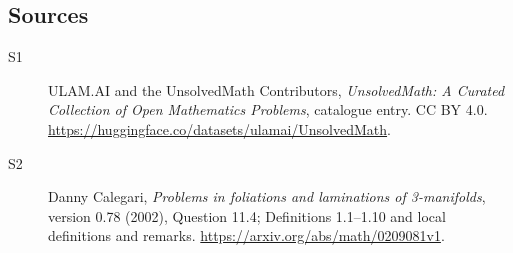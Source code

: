 \documentclass[11pt]{article}
\begin{document}
\subsection{Sources}
\begin{description}
\item[\hypertarget{source:statement:1}{S1}] ULAM.AI and the UnsolvedMath Contributors, \emph{UnsolvedMath: A Curated Collection of Open Mathematics Problems}, catalogue entry. CC BY 4.0. \url{https://huggingface.co/datasets/ulamai/UnsolvedMath}.
\item[\hypertarget{source:statement:2}{S2}] Danny Calegari, \emph{Problems in foliations and laminations of 3-manifolds}, version 0.78 (2002), Question 11.4; Definitions 1.1--1.10 and local definitions and remarks. \url{https://arxiv.org/abs/math/0209081v1}.
\end{description}
\label{end:statement}
\end{document}

